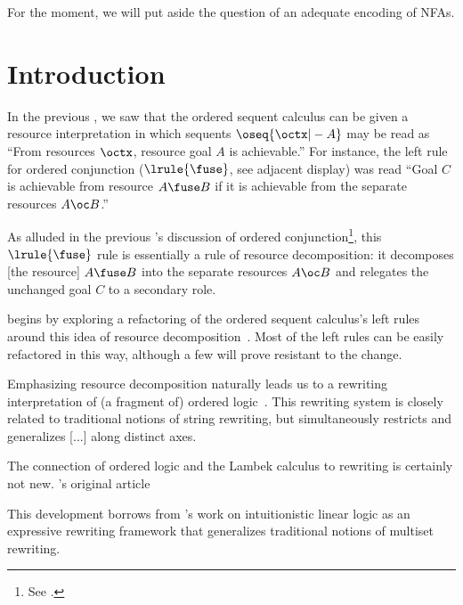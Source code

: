 For the moment, we will put aside the question of an adequate encoding of \acp{NFA}.



\section{Introduction}

In the previous , we saw that the ordered sequent calculus can be given a resource interpretation in which sequents $\oseq{\octx |- A}$ may be read as \enquote{From resources $\octx$, resource goal $A$ is achievable.}
For instance, the left rule for ordered conjunction ($\lrule{\fuse}$, see adjacent display)%
was read \enquote{Goal $C$ is achievable from resource $A \fuse B$ if it is achievable from the separate resources $A \oc B$.}

As alluded in the previous 's discussion of ordered conjunction\footnote{See .}, this $\lrule{\fuse}$ rule is essentially a rule of resource decomposition: it decomposes [the resource] $A \fuse B$ into the separate resources $A \oc B$ and relegates the unchanged goal $C$ to a secondary role.

begins by exploring a refactoring of the ordered sequent calculus's left rules around this idea of resource decomposition~.
Most of the left rules can be easily refactored in this way, although a few will prove resistant to the change.

Emphasizing resource decomposition naturally leads us to a rewriting interpretation of (a fragment of) ordered logic~.
This rewriting system is closely related to traditional notions of string rewriting\autocite{??}, but simultaneously restricts and generalizes [...] along distinct axes.

The connection of ordered logic and the Lambek calculus to rewriting is certainly not new.
's original article\autocite{Lambek:AMM58}

This development borrows from \citeauthor{Cervesato+Scedrov:IC09}'s work on intuitionistic linear logic as an expressive rewriting framework that generalizes traditional notions of multiset rewriting.\autocite{Cervesato+Scedrov:IC09}




